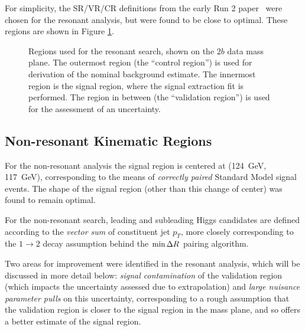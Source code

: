 For simplicity, the SR/VR/CR definitions from the early Run 2 paper~\cite{EXOT-2016-31} were chosen 
for the resonant analysis, but were found to be close to optimal. These regions are shown in Figure 
\ref{fig:res-regions}.

\begin{figure}
\centering
{}
\caption{\label{fig:res-regions} Regions used for the resonant search, shown on the $2b$ data  
mass plane. The outermost region (the ``control region'') is used for derivation of the nominal 
background estimate. The innermost region is the signal region, where the signal extraction 
fit is performed. The region in between (the ``validation region'') is used for the assessment of an 
uncertainty.}
\end{figure}

\subsection{Non-resonant Kinematic Regions}
For the non-resonant analysis the signal region is centered at (\SI{124}{\GeV}, \SI{117}{\GeV}),
corresponding to the means of \emph{correctly paired} Standard Model signal events. The shape of 
the signal region (other than this change of center) was found to remain optimal.

For the non-resonant search, leading and subleading Higgs candidates are defined according to the 
\emph{vector sum} of constituent jet $p_{T}$, more closely corresponding to the $1\rightarrow 2$ decay assumption
behind the $\min{\ensuremath{\Delta R}}$ pairing algorithm. 

Two areas for improvement were identified in the resonant analysis, which will be discussed in more detail below: 
\emph{signal contamination} of the validation region (which impacts the uncertainty assessed due to extrapolation)
and \emph{large nuisance parameter pulls} on this uncertainty, corresponding to a rough assumption that the 
validation region is closer to the signal region in the mass plane, and so offers a better estimate of the 
signal region.

